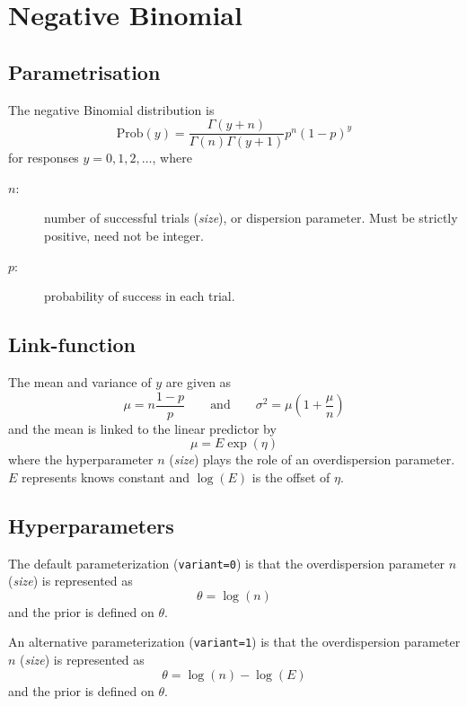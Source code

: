 \documentclass[a4paper,11pt]{article}
\begin{document}
\section*{Negative Binomial}

\subsection*{Parametrisation}

The negative Binomial distribution is
\begin{displaymath}
    \text{Prob}(y) = \frac{\Gamma(y+n)}{\Gamma(n) \Gamma(y+1)} p^n (1-p)^y
\end{displaymath}
for responses $y=0, 1, 2, \ldots$, where
\begin{description}
\item[$n$:] number of successful trials (\emph{size}), or dispersion
    parameter. Must be strictly positive, need not be integer.
\item[$p$:] probability of success in each trial.
\end{description}

\subsection*{Link-function}

The mean and variance of $y$ are given as 
\begin{displaymath}
    \mu = n \frac{1-p}{p} \qquad\text{and}\qquad \sigma^{2} = \mu(1 + \frac{\mu}{n})
\end{displaymath}
and the mean is linked to the linear predictor by
\begin{displaymath}
    \mu = E \exp(\eta)
\end{displaymath}
where the hyperparameter $n$ (\emph{size}) plays the role of an
overdispersion parameter. $E$ represents knows constant and $\log(E)$
is the offset of $\eta$.

\subsection*{Hyperparameters}

The default parameterization (\verb|variant=0|) is that the
overdispersion parameter $n$ (\emph{size}) is represented as
\begin{displaymath}
    \theta = \log(n)
\end{displaymath}
and the prior is defined on $\theta$. 

An alternative parameterization (\verb|variant=1|) is that the
overdispersion parameter $n$ (\emph{size}) is represented as
\begin{displaymath}
    \theta = \log(n) - \log(E)
\end{displaymath}
and the prior is defined on $\theta$. 
\end{document}
